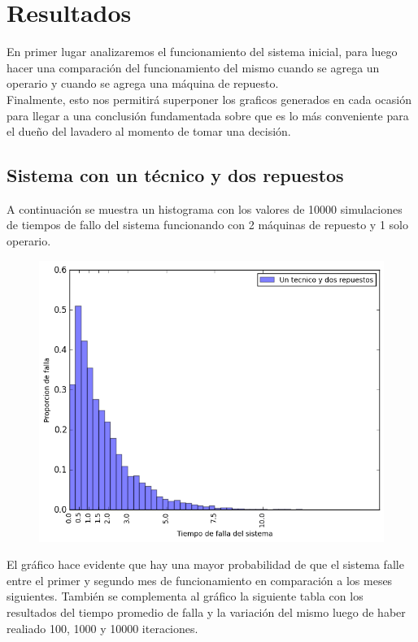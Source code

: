 \documentclass[10pt,a4paper]{article} %
\begin{document}
    \newpage
    \section{Resultados}
    En primer lugar analizaremos el funcionamiento del sistema inicial, para luego hacer una comparaci\'on del funcionamiento del mismo cuando se agrega un operario y cuando se agrega una m\'aquina de repuesto.\\
    Finalmente, esto nos permitir\'a superponer los graficos generados en cada ocasi\'on para llegar a una conclusi\'on fundamentada sobre que es lo m\'as conveniente para el due\~no del lavadero al momento de tomar una decisi\'on.
    
    \subsection{Sistema con un t\'ecnico y dos repuestos}
    A continuaci\'on se muestra un histograma con los valores de 10000 simulaciones de tiempos de fallo del sistema funcionando con 2 m\'aquinas de repuesto y 1 solo operario.
    \begin {figure}[!htb]
    \centering
    \includegraphics[width=12cm] {img/1op2rep}
    \end {figure}
    
    El gr\'afico hace evidente que hay una mayor probabilidad de que el sistema falle entre el primer y segundo mes de funcionamiento en comparaci\'on a los meses siguientes. Tambi\'en se complementa al gr\'afico la siguiente tabla con los resultados del tiempo promedio de falla y la variaci\'on del mismo luego de haber realiado 100, 1000 y 10000 iteraciones.
    
\end{document}
